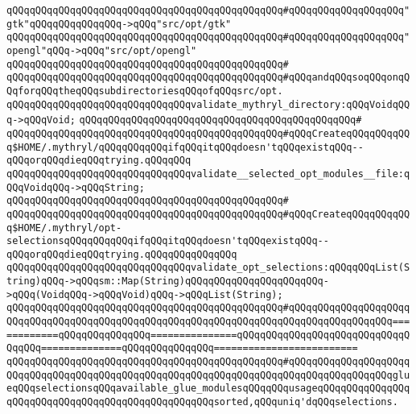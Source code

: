 \verb|qQQqqQQqqQQqqQQqqQQqqQQqqQQqqQQqqQQqqQQqqQQqqQQq#qQQqqQQqqQQqqQQqqQQq"gtk"qQQqqQQqqQQqqQQq->qQQq"src/opt/gtk"|\newline
\verb|qQQqqQQqqQQqqQQqqQQqqQQqqQQqqQQqqQQqqQQqqQQqqQQq#qQQqqQQqqQQqqQQqqQQq"opengl"qQQq->qQQq"src/opt/opengl"|\newline
\verb|qQQqqQQqqQQqqQQqqQQqqQQqqQQqqQQqqQQqqQQqqQQqqQQq#|\newline
\verb|qQQqqQQqqQQqqQQqqQQqqQQqqQQqqQQqqQQqqQQqqQQqqQQq#qQQqandqQQqsoqQQqonqQQqforqQQqtheqQQqsubdirectoriesqQQqofqQQqsrc/opt.|\newline
\newline
\verb|qQQqqQQqqQQqqQQqqQQqqQQqqQQqqQQqvalidate_mythryl_directory:qQQqVoidqQQq->qQQqVoid;|\newline
\verb|qQQqqQQqqQQqqQQqqQQqqQQqqQQqqQQqqQQqqQQqqQQqqQQq#|\newline
\verb|qQQqqQQqqQQqqQQqqQQqqQQqqQQqqQQqqQQqqQQqqQQqqQQq#qQQqCreateqQQqqQQqqQQq$HOME/.mythryl/qQQqqQQqqQQqifqQQqitqQQqdoesn'tqQQqexistqQQq--qQQqorqQQqdieqQQqtrying.qQQqqQQq|\newline
\newline
\newline
\verb|qQQqqQQqqQQqqQQqqQQqqQQqqQQqqQQqvalidate__selected_opt_modules__file:qQQqVoidqQQq->qQQqString;|\newline
\verb|qQQqqQQqqQQqqQQqqQQqqQQqqQQqqQQqqQQqqQQqqQQqqQQq#|\newline
\verb|qQQqqQQqqQQqqQQqqQQqqQQqqQQqqQQqqQQqqQQqqQQqqQQq#qQQqCreateqQQqqQQqqQQq$HOME/.mythryl/opt-selectionsqQQqqQQqqQQqifqQQqitqQQqdoesn'tqQQqexistqQQq--qQQqorqQQqdieqQQqtrying.qQQqqQQqqQQqqQQq|\newline
\newline
\verb|qQQqqQQqqQQqqQQqqQQqqQQqqQQqqQQqvalidate_opt_selections:qQQqqQQqList(String)qQQq->qQQqsm::Map(String)qQQqqQQqqQQqqQQqqQQqqQQq->qQQq(VoidqQQq->qQQqVoid)qQQq->qQQqList(String);|\newline
\verb|qQQqqQQqqQQqqQQqqQQqqQQqqQQqqQQqqQQqqQQqqQQqqQQq#qQQqqQQqqQQqqQQqqQQqqQQqqQQqqQQqqQQqqQQqqQQqqQQqqQQqqQQqqQQqqQQqqQQqqQQqqQQqqQQqqQQqqQQq============qQQqqQQqqQQqqQQq===============qQQqqQQqqQQqqQQqqQQqqQQqqQQqqQQqqQQq==============qQQqqQQqqQQqqQQq=========================|\newline
\verb|qQQqqQQqqQQqqQQqqQQqqQQqqQQqqQQqqQQqqQQqqQQqqQQq#qQQqqQQqqQQqqQQqqQQqqQQqqQQqqQQqqQQqqQQqqQQqqQQqqQQqqQQqqQQqqQQqqQQqqQQqqQQqqQQqqQQqqQQqglueqQQqselectionsqQQqavailable_glue_modulesqQQqqQQqusageqQQqqQQqqQQqqQQqqQQqqQQqqQQqqQQqqQQqqQQqqQQqqQQqqQQqsorted,qQQquniq'dqQQqselections.|\newline
